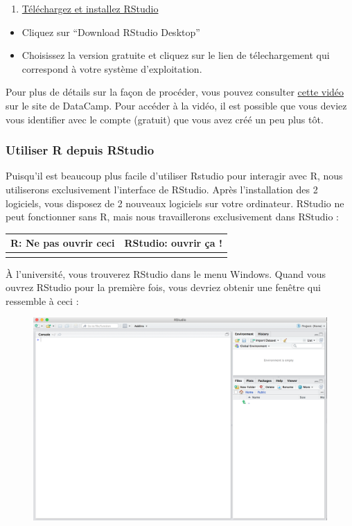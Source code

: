 \documentclass[a4paperpaper,]{article}
\providecommand{\tightlist}{%
  \setlength{\itemsep}{0pt}\setlength{\parskip}{0pt}}
\theoremstyle{definition}
\theoremstyle{definition}
\theoremstyle{definition}
\theoremstyle{remark}
\begin{document}
\begin{enumerate}
\def\labelenumi{\arabic{enumi}.}
\setcounter{enumi}{1}
\tightlist
\item
  \href{https://www.rstudio.com/products/RStudio/\#Desktop}{Téléchargez
  et installez RStudio}
\end{enumerate}

\begin{itemize}
\tightlist
\item
  Cliquez sur ``Download RStudio Desktop''
\item
  Choisissez la version gratuite et cliquez sur le lien de
  télechargement qui correspond à votre système d'exploitation.
\end{itemize}

Pour plus de détails sur la façon de procéder, vous pouvez consulter
\href{https://campus.datacamp.com/courses/working-with-the-rstudio-ide-part-1/orientation?ex=3}{cette
vidéo} sur le site de DataCamp. Pour accéder à la vidéo, il est possible
que vous deviez vous identifier avec le compte (gratuit) que vous avez
créé un peu plus tôt.

\subsubsection{Utiliser R depuis
RStudio}\label{utiliser-r-depuis-rstudio}

Puisqu'il est beaucoup plus facile d'utiliser Rstudio pour interagir
avec R, nous utiliserons exclusivement l'interface de RStudio. Après
l'installation des 2 logiciels, vous disposez de 2 nouveaux logiciels
sur votre ordinateur. RStudio ne peut fonctionner sans R, mais nous
travaillerons exclusivement dans RStudio :

\begin{longtable}[]{@{}cc@{}}
\toprule
R: Ne pas ouvrir ceci & RStudio: ouvrir ça !\tabularnewline
\midrule
\endhead
&\tabularnewline
\bottomrule
\end{longtable}

À l'université, vous trouverez RStudio dans le menu Windows. Quand vous
ouvrez RStudio pour la première fois, vous devriez obtenir une fenêtre
qui ressemble à ceci :

\begin{figure}
\centering
\includegraphics{images/rstudio.png}
\caption{}
\end{figure}
\end{document}
